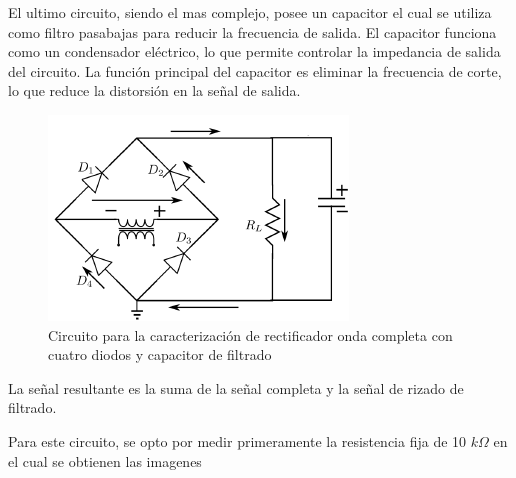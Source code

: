 \documentclass[10pt,letterpaper]{article}
\begin{document}
El ultimo circuito, siendo el mas complejo, posee un capacitor el cual 
se utiliza como filtro pasabajas para reducir la frecuencia de salida. El capacitor
funciona como un condensador eléctrico, lo que permite controlar la impedancia de salida
del circuito. La función principal del capacitor es eliminar la frecuencia de corte,
lo que reduce la distorsión en la señal de salida.

\begin{figure}[H]
	\centering
	\includegraphics[scale=1]{OndaCapacitorFiltrado.png}
	\caption{Circuito para la caracterización de rectificador onda completa con cuatro diodos y capacitor de filtrado}
	\label{fig:filtrado}
\end{figure}

La señal resultante es la suma de la señal completa y la señal de rizado de filtrado.

Para este circuito, se opto por medir 
primeramente la resistencia fija de 10
 $k\Omega$ en el cual se obtienen las imagenes
\end{document}

